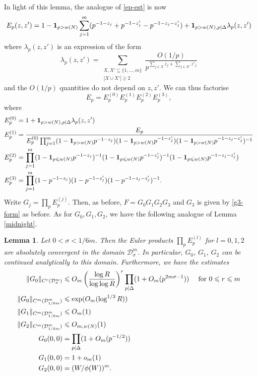 \documentclass[12pt,a4paper,reqno]{amsart}
\numberwithin{equation}{section}
\theoremstyle{plain}
\newtheorem{lemma}[subsection]{Lemma}
\theoremstyle{definition}
\renewcommand{\leq}{\leqslant}
\renewcommand{\geq}{\geqslant}
\def\D{{\mathcal D}}
\def\w{w}
\def\ni{\noindent}
\begin{document}
\ni In light of this lemma, the analogue of \eqref{ep-est} is now
\begin{equation}\label{ep-est2}
  E_p(z,z') = 1 - {\bf 1}_{p > \w(N)} 
\sum_{j = 1}^m (p^{-1 - z_j} + p^{-1 - z'_j} - p^{-1 - z_j - z'_j}) + 
{\bf 1}_{p > \w(N), p | \Delta} \lambda_p(z,z')
\end{equation}
where $\lambda_p(z,z')$ is an expression of the form
$$ \lambda_p(z,z') =
\sum_{\substack{X,X' \subseteq \{1,\dots,m\} \\ |X \cup X'| \geq 2}} 
\frac{ O(1/p)}{p^{\sum_{j \in X} z_j + \sum_{j \in X'} z'_j}}$$
and the $O(1/p)$ quantities do not depend on $z,z'$.
We can thus factorise \[E_p = E_p^{(0)} E_p^{(1)} E_p^{(2)} E_p^{(3)},\]
where
\begin{align*}
E_p^{(0)} &= 1 + {\bf 1}_{p > \w(N), p | \Delta} \lambda_p(z,z') \\
E_p^{(1)} &= \frac{E_p}{E_p^{(0)}
\prod_{j=1}^m (1 - {\bf 1}_{p > \w(N)}p^{-1-z_j})(1 - {\bf 1}_{p > \w(N)}p^{-1-z'_j})(1 - {\bf 1}_{p > \w(N)}p^{-1-z_j-z'_j})^{-1}} \\
E_p^{(2)} &= \prod_{j=1}^m (1 - {\bf 1}_{p \leq \w(N)}p^{-1-z_j})^{-1}(1 - {\bf 1}_{p \leq \w(N)}p^{-1-z'_j})^{-1}(1 - {\bf 1}_{p \leq w(N)}p^{-1-z_j-z'_j}) \\
E_p^{(3)} &= \prod_{j=1}^m (1 - p^{-1-z_j})(1 - p^{-1-z'_j})(1 - p^{-1-z_j-z'_j})^{-1}.
\end{align*}
Write $G_j = \prod_p E_p^{(j)}$. Then, as before, $F = G_0G_1G_2G_3$ and $G_3$
is given by \eqref{g3-form} as before.  As for $G_0, G_1, G_2$, we have
the following analogue of Lemma \ref{midnight}.

\begin{lemma}\label{noon}  Let $0 < \sigma < 1/6m$.  Then the Euler products $\prod_p E_p^{(l)}$ for $l=0,1,2$ are absolutely convergent in the domain
$\D^m_{\sigma}$.  In particular, $G_0$, $G_1$, $G_2$ can be continued analytically to this 
domain.  Furthermore, we have the estimates
\begin{align}
\| G_0 \|_{C^r(\D^m_{\sigma})} &\leq O_m \left( \frac{\log R}{\log \log R} \right)^r
\prod_{p | \Delta} (1 + O_m(p^{2m\sigma-1})) \quad 
\hbox{ for } 0 \leq r \leq m \label{G1-bound}\\
\| G_0 \|_{C^m(\D^m_{1/6m})} &\leq \exp(O_m(\log^{1/3} R)) \label{G1-bound2}\\
\| G_1 \|_{C^m(\D^m_{1/6m})} &\leq O_m(1) \nonumber\\
\| G_2 \|_{C^m(\D^m_{1/6m})} &\leq O_{m,\w(N)}(1) \nonumber\\
G_0(0,0) &= \prod_{p | \Delta} (1 + O_m(p^{-1/2}) ) \label{G1-bound3}\\
G_1(0,0) &= 1 + o_m(1) \nonumber\\
G_2(0,0) &= (W/\phi(W))^m.\nonumber
\end{align}
\end{lemma}
\end{document}
